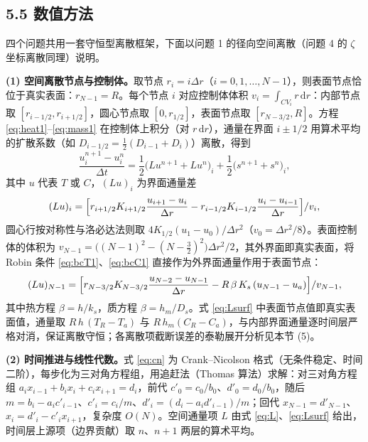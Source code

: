 \documentclass[12pt,a4paper]{ctexart}
\newcommand{\dd}{\,\mathrm{d}}
\begin{document}
\subsection{5.5 数值方法}

四个问题共用一套守恒型离散框架，下面以问题 1 的径向空间离散（问题 4 的 $\zeta$ 坐标离散同理）说明。

\textbf{(1) 空间离散节点与控制体。}取节点 $r_i=i\Delta r$（$i=0,1,\dots,N-1$），则表面节点恰位于真实表面：$r_{N-1}=R$。每个节点 $i$ 对应控制体体积 $v_i=\int_{CV_i} r\,\mathrm{d}r$：内部节点取 $[r_{i-1/2},r_{i+1/2}]$，圆心节点取 $[0,r_{1/2}]$，表面节点取 $[r_{N-3/2},R]$。方程 \eqref{eq:heat1}--\eqref{eq:mass1} 在控制体上积分（对 $r\dd r$），通量在界面 $i\pm1/2$ 用算术平均的扩散系数（如 $D_{i-1/2}=\frac12(D_{i-1}+D_i)$）离散，得到
\begin{equation}
\frac{u_i^{n+1}-u_i^n}{\Delta t}=\frac12\bigl(L u^{n+1}+Lu^n\bigr)_i+\frac12\bigl(s^{n+1}+s^n\bigr)_i,
\label{eq:cn}
\end{equation}
其中 $u$ 代表 $T$ 或 $C$，$(Lu)_i$ 为界面通量差
\begin{equation}
(Lu)_i=\Bigl[r_{i+1/2}K_{i+1/2}\frac{u_{i+1}-u_i}{\Delta r}-r_{i-1/2}K_{i-1/2}\frac{u_i-u_{i-1}}{\Delta r}\Bigr]/v_i,
\label{eq:L}
\end{equation}
圆心行按对称性与洛必达法则取 $4K_{1/2}(u_1-u_0)/\Delta r^2$（$v_0=\Delta r^2/8$）。表面控制体的体积为 $v_{N-1}=\bigl((N-1)^2-(N-\tfrac32)^2\bigr)\Delta r^2/2$，其外界面即真实表面，将 Robin 条件 \eqref{eq:bcT1}、\eqref{eq:bcC1} 直接作为外界面通量作用于表面节点：
\begin{equation}
(Lu)_{N-1}=\Bigl[r_{N-3/2}K_{N-3/2}\frac{u_{N-2}-u_{N-1}}{\Delta r}-R\,\beta\,K_s\,(u_{N-1}-u_a)\Bigr]/v_{N-1},
\label{eq:Lsurf}
\end{equation}
其中热方程 $\beta=h/k_s$，质方程 $\beta=h_m/D_s$。式 \eqref{eq:Lsurf} 中表面节点值即真实表面值，通量取 $R\,h\,(T_R-T_a)$ 与 $R\,h_m(C_R-C_a)$，与内部界面通量逐时间层严格对消，保证离散守恒；各离散项截断误差的泰勒展开分析见本节 (5)。

\textbf{(2) 时间推进与线性代数。}式 \eqref{eq:cn} 为 Crank--Nicolson 格式\cite{crank}（无条件稳定、时间二阶），每步化为三对角方程组，用追赶法（Thomas 算法）求解：对三对角方程组 $a_ix_{i-1}+b_ix_i+c_ix_{i+1}=d_i$，前代 $c'_0=c_0/b_0$、$d'_0=d_0/b_0$，随后 $m=b_i-a_ic'_{i-1}$、$c'_i=c_i/m$、$d'_i=(d_i-a_id'_{i-1})/m$；回代 $x_{N-1}=d'_{N-1}$、$x_i=d'_i-c'_ix_{i+1}$，复杂度 $O(N)$。空间通量项 $L$ 由式 \eqref{eq:L}、\eqref{eq:Lsurf} 给出，时间层上源项（边界贡献）取 $n$、$n+1$ 两层的算术平均。
\end{document}
